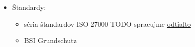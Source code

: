 \documentclass[12pt,a4paper]{article}
\begin{document}
{\begin{itemize}
\begin{itemize}
            \item NIS2 -- Európska smernica o kybernetickej bezpečnosti
            \begin{itemize}
                \item stanovuje povinnosti pre organizácie v kľúčových a dôležitých odvetviach s cieľom zlepšiť ich ochranu pred kybernetickými hrozbami a zvýšiť odolnosť ich IT a komunikačných systémov
            \end{itemize}
            \item GDPR
            \item eIDAS
        \end{itemize}
        \item Štandardy:
        \begin{itemize}
            \item séria štandardov ISO 27000 TODO spracujme  \href{https://www.csirt.sk/prehlad-standardov-iso-iec-27000.html}{odtiaľto}
            \item BSI Grundschutz
        \end{itemize}
    \end{itemize}
}
\end{document}
